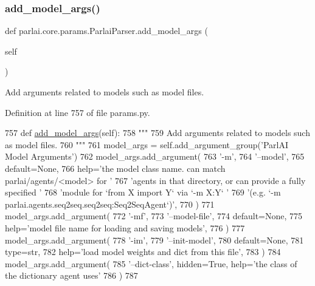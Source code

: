 \subsubsection{\texorpdfstring{add\+\_\+model\+\_\+args()}{add\_model\_args()}}
{\footnotesize\ttfamily def parlai.\+core.\+params.\+Parlai\+Parser.\+add\+\_\+model\+\_\+args (\begin{DoxyParamCaption}\item[{}]{self }\end{DoxyParamCaption})}

\begin{DoxyVerb}Add arguments related to models such as model files.
\end{DoxyVerb}
 

Definition at line 757 of file params.\+py.


\begin{DoxyCode}
757     \textcolor{keyword}{def }\hyperlink{namespacekvmemnn_1_1interactive_a01daf0f3da5f90af0ddfd1307850b28a}{add\_model\_args}(self):
758         \textcolor{stringliteral}{"""}
759 \textcolor{stringliteral}{        Add arguments related to models such as model files.}
760 \textcolor{stringliteral}{        """}
761         model\_args = self.add\_argument\_group(\textcolor{stringliteral}{'ParlAI Model Arguments'})
762         model\_args.add\_argument(
763             \textcolor{stringliteral}{'-m'},
764             \textcolor{stringliteral}{'--model'},
765             default=\textcolor{keywordtype}{None},
766             help=\textcolor{stringliteral}{'the model class name. can match parlai/agents/<model> for '}
767             \textcolor{stringliteral}{'agents in that directory, or can provide a fully specified '}
768             \textcolor{stringliteral}{'module for `from X import Y` via `-m X:Y` '}
769             \textcolor{stringliteral}{'(e.g. `-m parlai.agents.seq2seq.seq2seq:Seq2SeqAgent`)'},
770         )
771         model\_args.add\_argument(
772             \textcolor{stringliteral}{'-mf'},
773             \textcolor{stringliteral}{'--model-file'},
774             default=\textcolor{keywordtype}{None},
775             help=\textcolor{stringliteral}{'model file name for loading and saving models'},
776         )
777         model\_args.add\_argument(
778             \textcolor{stringliteral}{'-im'},
779             \textcolor{stringliteral}{'--init-model'},
780             default=\textcolor{keywordtype}{None},
781             type=str,
782             help=\textcolor{stringliteral}{'load model weights and dict from this file'},
783         )
784         model\_args.add\_argument(
785             \textcolor{stringliteral}{'--dict-class'}, hidden=\textcolor{keyword}{True}, help=\textcolor{stringliteral}{'the class of the dictionary agent uses'}
786         )
787 
\end{DoxyCode}
\mbox{\label{classparlai_1_1core_1_1params_1_1ParlaiParser_a46c57cd479d8780c4c22aecb3135d5fe}} 
